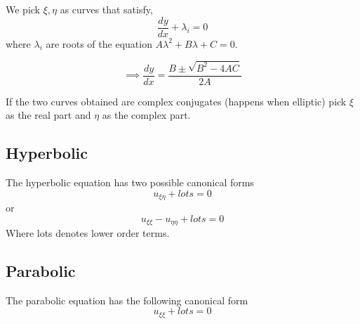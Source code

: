 \documentclass[oneside,11pt,pdftex,final]{book}%
\numberwithin{equation}{section}
\newtheorem{example}[theorem]{Example}
\numberwithin{section}{chapter}
\numberwithin{equation}{chapter}
\begin{document}
We pick $ \xi, \eta  $ as curves that satisfy,
\[ \frac{dy}{dx} +\lambda_i=0\] where $ \lambda_i  $ are roots of the equation $ A\lambda^2+B\lambda +C=0 $. 

\[ \implies \frac{dy}{dx} =\frac{B\pm \sqrt{B^2-4AC}}{2A}\]

If the two curves obtained are complex conjugates (happens when elliptic) pick $ \xi $ as the real part and $ \eta  $ as the complex part.



\subsection{Hyperbolic}
The hyperbolic equation has two possible canonical forms
\[ u_{\xi \eta}+lots=0 \]
or\[ u_{\xi \xi}-u_{\eta \eta}+lots=0 \]
Where lots denotes lower order terms.

%	
%
\subsection{Parabolic}
The parabolic equation has the following canonical form
\[ u_{\xi \xi}+lots=0 \]
%	
%
%
%
%
%
\end{document}

